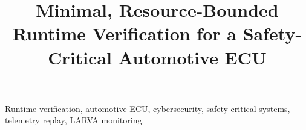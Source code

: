 \documentclass[conference]{IEEEtran}
\begin{document}
\title{Minimal, Resource-Bounded Runtime Verification for a Safety-Critical Automotive ECU}

\author{
}

\maketitle



\begin{IEEEkeywords}
Runtime verification, automotive ECU, cybersecurity, safety-critical systems, telemetry replay, LARVA monitoring.
\end{IEEEkeywords}

\IEEEpeerreviewmaketitle







% 
% 



\end{document}
